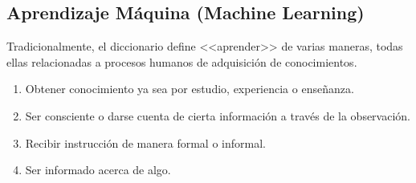 \documentclass[12pt]{article}
\begin{document}


\subsection{Aprendizaje Máquina (Machine Learning)}
Tradicionalmente, el diccionario define <<aprender>> de varias maneras, todas ellas relacionadas a procesos humanos de adquisición de conocimientos.
\begin{enumerate}
    \item Obtener conocimiento ya sea por estudio, experiencia o enseñanza.
    \item Ser consciente o darse cuenta de cierta información a través de la observación.
    \item Recibir instrucción de manera formal o informal.
    \item Ser informado acerca de algo.
\end{enumerate}
\end{document}
